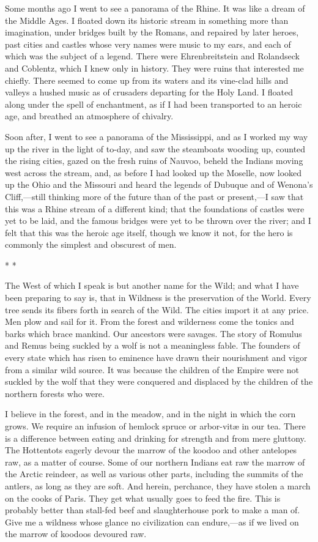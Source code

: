 \documentclass[twoside,openright,10pt]{memoir} %
\begin{document}
Some months ago I went to see a panorama of the Rhine. It was like a dream of the Middle Ages. I floated down its historic stream in something more than imagination, under bridges built by the Romans, and repaired by later heroes, past cities and castles whose very names were music to my ears, and each of which was the subject of a legend. There were Ehrenbreitstein and Rolandseck and Coblentz, which I knew only in history. They were ruins that interested me chiefly. There seemed to come up from its waters and its vine-clad hills and valleys a hushed music as of crusaders departing for the Holy Land. I floated along under the spell of enchantment, as if I had been transported to an heroic age, and breathed an atmosphere of chivalry.

Soon after, I went to see a panorama of the Mississippi, and as I worked my way up the river in the light of to-day, and saw the steamboats wooding up, counted the rising cities, gazed on the fresh ruins of Nauvoo, beheld the Indians moving west across the stream, and, as before I had looked up the Moselle, now looked up the Ohio and the Missouri and heard the legends of Dubuque and of Wenona’s Cliff,—still thinking more of the future than of the past or present,—I saw that this was a Rhine stream of a different kind; that the foundations of castles were yet to be laid, and the famous bridges were yet to be thrown over the river; and I felt that this was the heroic age itself, though we know it not, for the hero is commonly the simplest and obscurest of men.
\begin{center}\tiny * * * \normalsize \end{center}
The West of which I speak is but another name for the Wild; and what I have been preparing to say is, that in Wildness is the preservation of the World. Every tree sends its fibers forth in search of the Wild. The cities import it at any price. Men plow and sail for it. From the forest and wilderness come the tonics and barks which brace mankind. Our ancestors were savages. The story of Romulus and Remus being suckled by a wolf is not a meaningless fable. The founders of every state which has risen to eminence have drawn their nourishment and vigor from a similar wild source. It was because the children of the Empire were not suckled by the wolf that they were conquered and displaced by the children of the northern forests who were.

I believe in the forest, and in the meadow, and in the night in which the corn grows. We require an infusion of hemlock spruce or arbor-vitæ in our tea. There is a difference between eating and drinking for strength and from mere gluttony. The Hottentots eagerly devour the marrow of the koodoo and other antelopes raw, as a matter of course. Some of our northern Indians eat raw the marrow of the Arctic reindeer, as well as various other parts, including the summits of the antlers, as long as they are soft. And herein, perchance, they have stolen a march on the cooks of Paris. They get what usually goes to feed the fire. This is probably better than stall-fed beef and slaughterhouse pork to make a man of. Give me a wildness whose glance no civilization can endure,—as if we lived on the marrow of koodoos devoured raw.
\end{document}
